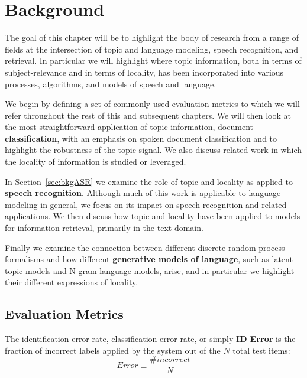 \chapter{Background}
\label{sec:bkg}

The goal of this chapter will be to highlight the body of research from a range of fields at the intersection of topic and language modeling, speech recognition, and retrieval.   In particular we will highlight where topic information, both in terms of subject-relevance and in terms of locality, has been incorporated into various processes, algorithms, and models of speech and language.

We begin by defining a set of commonly used evaluation metrics to which we will refer throughout the rest of this and subsequent chapters.   We will then look at the most straightforward application of topic information, document \textbf{classification}, with an emphasis on spoken document classification and to highlight the robustness of the topic signal.  We also discuss related work in which the locality of information is studied or leveraged.  

In Section~\ref{sec:bkgASR} we examine the role of topic and locality as applied to \textbf{speech recognition}.  Although much of this work is applicable to language modeling in general, we focus on its impact on speech recognition and related applications.  We then discuss how topic and locality have been applied to models for information retrieval, primarily in the text domain.

Finally we examine the connection between different discrete random process formalisms and how different \textbf{generative models of language}, such as latent topic models and N-gram language models, arise, and in particular we highlight their different expressions of locality.


\section{Evaluation Metrics}
\label{sec:bkgMetrics}

The identification error rate, classification error rate, or simply \textbf{ID Error} is the fraction of incorrect labels applied by the system out of the $N$ total test items:
\begin{equation}
Error \equiv \frac{\# incorrect}{N}
\end{equation}

